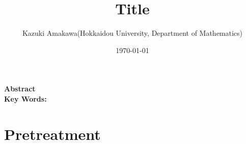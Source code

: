 \documentclass[12pt]{article}
\title{Title}
\author{Kazuki Amakawa(Hokkaidou University, Department of Mathematics)}
\date{\today}
\theoremstyle{plain}
\begin{document}
\maketitle
\noindent \textbf{Abstract}\\

\noindent \textbf{Key Words:} \\
\newpage

\section{Pretreatment}


%
%
\end{document}
